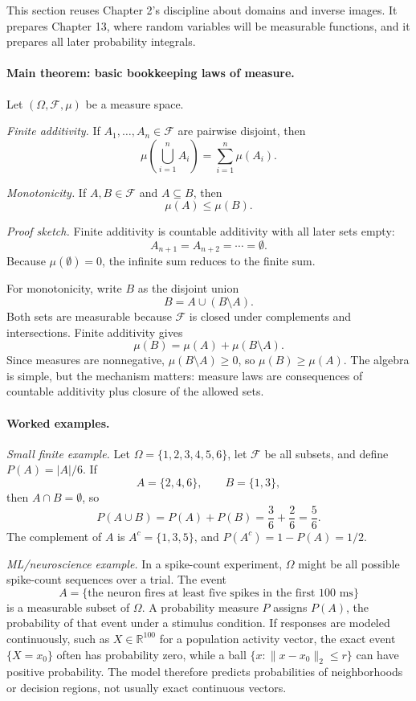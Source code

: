 This section reuses Chapter 2's discipline about domains and inverse images. It prepares Chapter 13, where random variables will be measurable functions, and it prepares all later probability integrals.

\paragraph{Main theorem: basic bookkeeping laws of measure.}
Let \((\Omega,\mathcal{F},\mu)\) be a measure space.

\emph{Finite additivity.} If \(A_1,\ldots,A_n\in\mathcal{F}\) are pairwise disjoint, then
\[
\mu\!\left(\bigcup_{i=1}^n A_i\right)
=\sum_{i=1}^n\mu(A_i).
\]

\emph{Monotonicity.} If \(A,B\in\mathcal{F}\) and \(A\subseteq B\), then
\[
\mu(A)\leq \mu(B).
\]

\emph{Proof sketch.}
Finite additivity is countable additivity with all later sets empty:
\[
A_{n+1}=A_{n+2}=\cdots=\emptyset.
\]
Because \(\mu(\emptyset)=0\), the infinite sum reduces to the finite sum.

For monotonicity, write \(B\) as the disjoint union
\[
B=A\cup(B\setminus A).
\]
Both sets are measurable because \(\mathcal{F}\) is closed under complements and intersections. Finite additivity gives
\[
\mu(B)=\mu(A)+\mu(B\setminus A).
\]
Since measures are nonnegative, \(\mu(B\setminus A)\geq0\), so \(\mu(B)\geq\mu(A)\). The algebra is simple, but the mechanism matters: measure laws are consequences of countable additivity plus closure of the allowed sets.

\paragraph{Worked examples.}
\emph{Small finite example.} Let \(\Omega=\{1,2,3,4,5,6\}\), let \(\mathcal{F}\) be all subsets, and define \(P(A)=|A|/6\). If
\[
A=\{2,4,6\},\qquad B=\{1,3\},
\]
then \(A\cap B=\emptyset\), so
\[
P(A\cup B)=P(A)+P(B)=\frac{3}{6}+\frac{2}{6}=\frac{5}{6}.
\]
The complement of \(A\) is \(A^c=\{1,3,5\}\), and \(P(A^c)=1-P(A)=1/2\).

\emph{ML/neuroscience example.} In a spike-count experiment, \(\Omega\) might be all possible spike-count sequences over a trial. The event
\[
A=\{\text{the neuron fires at least five spikes in the first }100\text{ ms}\}
\]
is a measurable subset of \(\Omega\). A probability measure \(P\) assigns \(P(A)\), the probability of that event under a stimulus condition. If responses are modeled continuously, such as \(X\in\mathbb{R}^{100}\) for a population activity vector, the exact event \(\{X=x_0\}\) often has probability zero, while a ball \(\{x:\|x-x_0\|_2\leq r\}\) can have positive probability. The model therefore predicts probabilities of neighborhoods or decision regions, not usually exact continuous vectors.

